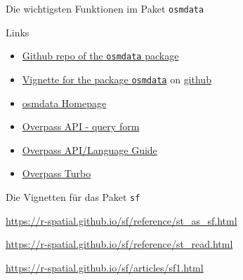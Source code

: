 \documentclass[ignorenonframetext,]{beamer}
\providecommand{\tightlist}{%
  \setlength{\itemsep}{0pt}\setlength{\parskip}{0pt}}
\begin{document}
\begin{frame}{Die wichtigsten Funktionen im Paket \texttt{osmdata}}
\protect\hypertarget{die-wichtigsten-funktionen-im-paket-osmdata}{}

\end{frame}

\begin{frame}[fragile]{Links}
\protect\hypertarget{links}{}

\begin{itemize}
\tightlist
\item
  \href{https://github.com/ropensci/osmdata}{Github repo of the
  \texttt{osmdata} package}
\item
  \href{https://cran.r-project.org/web/packages/osmdata/vignettes/osmdata.html}{Vignette
  for the package \texttt{osmdata}} on
  \href{https://github.com/ropensci/osmdata/blob/master/vignettes/osmdata.Rmd}{github}
\item
  \href{https://ropensci.github.io/osmdata/}{osmdata Homepage}
\item
  \href{http://overpass-api.de/query_form.html}{Overpass API - query
  form}
\item
  \href{https://wiki.openstreetmap.org/wiki/DE:Overpass_API/Language_Guide}{Overpass
  API/Language Guide}
\item
  \href{https://wiki.openstreetmap.org/wiki/DE:Overpass_turbo}{Overpass
  Turbo} 
\end{itemize}

\begin{block}{Die Vignetten für das Paket \texttt{sf}}

\url{https://r-spatial.github.io/sf/reference/st_as_sf.html}

\url{https://r-spatial.github.io/sf/reference/st_read.html}

\url{https://r-spatial.github.io/sf/articles/sf1.html}

\end{block}

\end{frame}
\end{document}
